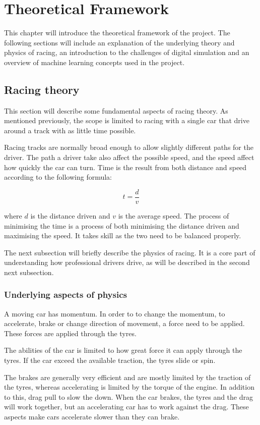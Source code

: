 \chapter{Theoretical Framework}
This chapter will introduce the theoretical framework of the project. The following sections will include an explanation of the underlying theory and physics of racing, an introduction to the challenges of digital simulation and an overview of machine learning concepts used in the project. 


\section{Racing theory}
This section will describe some fundamental aspects of racing theory. As mentioned previously, the scope is limited to racing with a single car that drive around a track with as little time possible.

Racing tracks are normally broad enough to allow slightly different paths for the driver. The path a driver take also affect the possible speed, and the speed affect how quickly the car can turn. Time is the result from both distance and speed according to the following formula:

\[
t = \frac{d}{v}
\]

where $d$ is the distance driven and $v$ is the average speed. The process of minimising the time is a process of both minimising the distance driven and maximising the speed. It takes skill as the two need to be balanced properly.

The next subsection will briefly describe the physics of racing. It is a core part of understanding how professional drivers drive, as will be described in the second next subsection.

\subsection{Underlying aspects of physics}
A moving car has momentum. In order to to change the momentum, to accelerate, brake or change direction of movement, a force need to be applied. These forces are applied through the tyres. 

The abilities of the car is limited to how great force it can apply through the tyres. If the car exceed the available traction, the tyres slide or spin. 

The brakes are generally very efficient and are mostly limited by the traction of the tyres, whereas accelerating is limited by the torque of the engine. In addition to this, drag pull to slow the down. When the car brakes, the tyres and the drag will work together, but an accelerating car has to work against the drag. These aspects make cars accelerate slower than they can brake.

